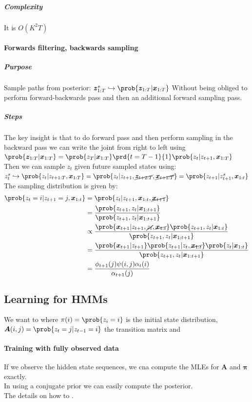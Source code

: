 \subparagraph{Complexity}
It is $O(K^{2}T)$

\paragraph{Forwards filtering, backwards sampling}
\subparagraph{Purpose}
Sample paths from posterior: $\bm{z}^{s}_{1:T} \hookrightarrow \prob{\bm{z}_{1:T}|\bm{x}_{1:T}}$
Without being obliged to perform forward-backwards pass and then an additional forward sampling pass.
\subparagraph{Steps}
The key insight is that to do forward pass and then perform sampling in the backward pass we can
write the joint from right to left using $\prob{\bm{z}_{1:T}|\bm{x}_{1:T}} = \prob{z_{T}|\bm{x}_{1:T}
}\prd{t=T-1}{1}\prob{z_{t}|z_{t+1},\bm{x}_{1:T}}$\\
Then we can sample $z_{t}$ given future sampled states using:
$z^{s}_{t} \hookrightarrow\prob{z_{t}|z_{t+1:T},\bm{x}_{1:T}} = \prob{z_{t}|z_{t+1},\cancel{\bm{z}_{
t+2:T}}, \cancel{\bm{x}_{t+1:T}}} =  \prob{z_{t+1}|z_{t+1}^{s},\bm{x}_{1:t}}$\\

The sampling distribution is given by:
\begin{align*}
    \prob{z_{t}=i|z_{t+1}=j,\bm{x}_{1:t}}
    &= \prob{z_{t}|z_{t+1},\bm{x}_{1:t},\cancel{\bm{x}_{t+1}}}\\
    &= \dfrac{\prob{z_{t+1},z_{t}|\bm{x}_{1:t+1}}}{\prob{z_{t+1},z_{t}|\bm{x}_{1:t+1}}}\\
    &\propto \dfrac{\prob{\bm{x}_{t+1}|z_{t+1},\cancel{z_{t}},\cancel{\bm{x}_{1:t}}}\prob{z_{t+1},
            z_{t}|\bm{x}_{1:t}}}{\prob{z_{t+1},z_{t}|\bm{x}_{1:t+1}}}\\
    &= \dfrac{\prob{\bm{x}_{t+1}|z_{t+1}}\prob{z_{t+1}|z_{t},\cancel{\bm{x}_{1:t}}}\prob{z_{t}|
    \bm{x}_{1:t}}}{\prob{z_{t+1},z_{t}|\bm{x}_{1:t+1}}}\\
    &= \dfrac{\phi_{t+1}(j)\psi(i,j)\alpha_{t}(i)}{\alpha_{t+1}(j)}
\end{align*}

\subsection{Learning for HMMs}
We want to  where $\pi(i)=\prob{
z_{i}=i}$ is the initial state distribution, $\bm{A}(i,j)=\prob{z_{t}=j|z_{t-1}=i}$ the transition
matrix and 
\paragraph{Training with fully observed data}
If we observe the hidden state sequences, we cna compute the MLEs for $\bm{A}$ and $\bm{\pi}$ 
exactly. \\
In using a conjugate prior we can easily compute the posterior.\\
The details on how to .

